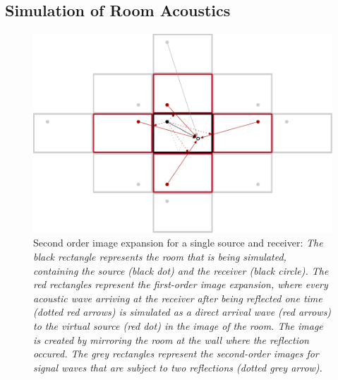 \subsection{Simulation of Room Acoustics}
\label{sec:simulation}

\begin{figure}[!htb]
\centering
    \includegraphics[width=\textwidth]{data/figures/image-method3}
    \caption[Second order image expansion for a single source and receiver]{Second order image expansion for a single source and receiver: \itshape The black rectangle represents the room that is being simulated, containing the source (black dot) and the receiver (black circle). The red rectangles represent the first-order image expansion, where every acoustic wave arriving at the receiver after being reflected one time (dotted red arrows) is simulated as a direct arrival wave (red arrows) to the virtual source (red dot) in the image of the room. The image is created by mirroring the room at the wall where the reflection occured. The grey rectangles represent the second-order images for signal waves that are subject to two reflections (dotted grey arrow).}
    \label{fig:imageMethod}
\end{figure}

